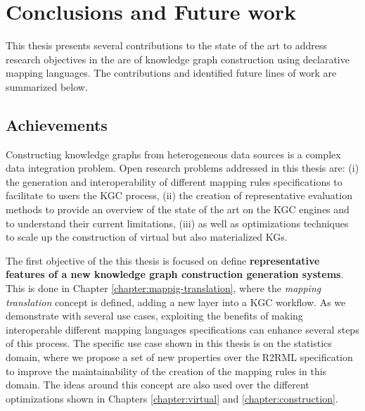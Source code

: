 \chapter{Conclusions and Future work}
\label{chap:conc}
This thesis presents several contributions to the state of the art to address research objectives in the are of knowledge graph construction using declarative mapping languages. The contributions and identified future lines of work are summarized below.


\section{Achievements}
Constructing knowledge graphs from heterogeneous data sources is a complex data integration problem. Open research problems addressed in this thesis are: (i) the generation and interoperability of different mapping rules specifications to facilitate to users the KGC process, (ii) the creation of representative evaluation methods to provide an overview of the state of the art on the KGC engines and to understand their current limitations, (iii) as well as optimizations techniques to scale up the construction of virtual but also materialized KGs. 
 
 
The first objective of the this thesis is focused on define \textbf{representative features of a new knowledge graph construction generation systems}. This is done in Chapter \ref{chapter:mappig-translation}, where the \textit{mapping translation} concept is defined, adding a new layer into a KGC workflow. As we demonstrate with several use cases, exploiting the benefits of making interoperable different mapping languages specifications can enhance several steps of this process. The specific use case shown in this thesis is on the statistics domain, where we propose a set of new properties over the R2RML specification to improve the maintainability of the creation of the mapping rules in this domain. The ideas around this concept are also used over the different optimizations shown in Chapters \ref{chapter:virtual} and \ref{chapter:construction}.

